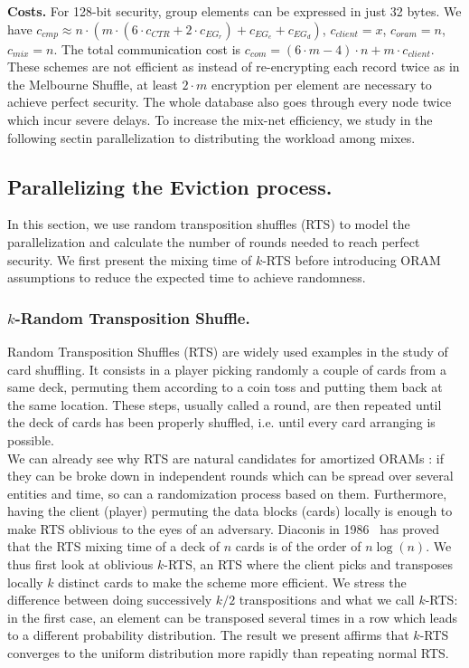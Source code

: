 \documentclass{llncs}
\begin{document}
\noindent\textbf{Costs.} For 128-bit security, group elements can be expressed in just 32 bytes. We have $c_{cmp} \approx n \cdot  \left ( m \cdot  \left ( 6\cdot c_{CTR} + 2 \cdot c_{EG_r} \right ) + c_{EG_e} + c_{EG_d}\right ) $, $c_{client}=  x$, $c_{oram}=n$, $c_{mix}=n$. The total communication cost is $c_{com}=(6\cdot m-4)\cdot n + m\cdot c_{client}$.\\


These schemes are not efficient as instead of re-encrypting each record twice as in the Melbourne Shuffle, at least $2\cdot m$ encryption per element are necessary to achieve perfect security. The whole database also goes through every node twice which incur severe delays. To increase the mix-net efficiency, we study in the following sectin parallelization to distributing the workload among mixes.
%
\subsection{Parallelizing the Eviction process.}\label{Parallel}
In this section, we use random transposition shuffles (RTS) to model the parallelization  and calculate the number of rounds needed to reach perfect security.
We first present the mixing time of $k$-RTS before introducing ORAM assumptions to reduce the expected time to achieve randomness.
%
\subsubsection{$k$-Random Transposition Shuffle.}\label{kRTS}
Random Transposition Shuffles (RTS) are widely used examples in the study of card shuffling. It consists in a player picking randomly a couple of cards from a same deck, permuting them according to a coin toss and putting them back at the same location.
These steps, usually called a round, are then repeated until the deck of cards has been properly shuffled, i.e. until every card arranging is possible.\\
We can already see why RTS are natural candidates for amortized ORAMs : if they can be broke down in independent rounds which can be spread over several entities and time, so can a randomization process based on them. Furthermore, having the client (player) permuting the data blocks (cards) locally is enough to make RTS oblivious to the eyes of an adversary.
Diaconis in 1986~\cite{aldous1986shuffling} has proved that the RTS mixing time of a deck of $n$ cards is of the order of $n\log(n)$. We thus first look at oblivious $k$-RTS, an RTS where the client picks and transposes locally $k$ distinct cards to make the scheme more efficient. We stress the difference between doing successively $k/2$ transpositions and what we call $k$-RTS: in the first case, an element can be transposed several times in a row which leads to a different probability distribution. The result we present affirms that  $k$-RTS converges to the uniform distribution more rapidly than repeating normal RTS.  
\end{document}
